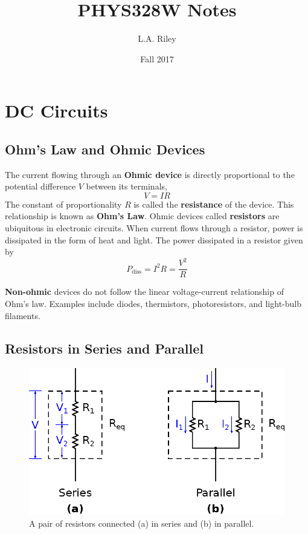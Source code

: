 \documentclass[11pt]{article}
\title{PHYS328W Notes} \author{L.A. Riley} \date{Fall 2017}
\begin{document}
\thispagestyle{empty}

\maketitle

\section{DC Circuits}

\subsection{Ohm's Law and Ohmic Devices}
The current flowing through an \textbf{Ohmic device} is directly
proportional to the potential difference $V$ between its terminals,
\begin{equation}
  V=IR
\label{eq:Ohm}
\end{equation}
The constant of proportionality $R$ is called the \textbf{resistance}
of the device. This relationship is known as \textbf{Ohm's Law}. Ohmic
devices called \textbf{resistors} are ubiquitous in electronic
circuits. When current flows through a resistor, power is dissipated
in the form of heat and light. The power dissipated in a resistor
given by
\begin{equation}
  P_\mathrm{diss} = I^2 R = \frac{V^2}{R}
\end{equation}

\textbf{Non-ohmic} devices do not follow the linear voltage-current
relationship of Ohm's law. Examples include diodes, thermistors,
photoresistors, and light-bulb filaments.

\subsection{Resistors in Series and Parallel}
\label{sec:serpar}

\begin{figure}[ht]
  \begin{center}
    \includegraphics{seriesparallel.eps}
    \caption{A pair of resistors connected (a) in series and (b) in
      parallel.}
    \label{fig:seriesparallel}
  \end{center}
\end{figure}
\end{document}
